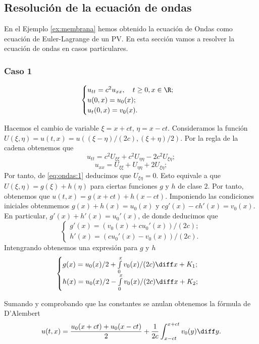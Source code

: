\documentclass{article}
\begin{document}
\subsection{Resolución de la ecuación de ondas}

En el Ejemplo \ref{ex:membrana} hemos obtenido la ecuación de Ondas como ecuación de Euler-Lagrange de un PV. En esta sección vamos a resolver la ecuación de ondas en casos particulares.

\subsubsection{Caso 1}

\begin{equation}
\label{eq:ondas:1}
  \begin{cases}
    u_{tt} = c^2 u_{xx}, \quad t \ge 0, x \in \R; \\
    u(0,x) = u_0(x); \\
    u_t(0,x) = v_0(x).
  \end{cases}
\end{equation}

Hacemos el cambio de variable $\xi = x + ct$, $\eta = x -ct$. Consideramos la función $U(\xi, \eta) = u(t,x) = u( (\xi-\eta)/(2c), (\xi+\eta)/2)$. Por la regla de la cadena obtenemos que
\[ u_{tt} = c^{2} U_{\xi \xi} + c^2 U_{\eta \eta} - 2c^2 U_{\xi \eta}; \]
\[ u_{xx} = U_{\xi \xi} +  U_{\eta \eta} +2 U_{\xi \eta}; \]
Por tanto, de \eqref{eq:ondas:1} deducimos que $U_{\xi \eta} = 0$. Esto equivale a que $U(\xi, \eta) = g(\xi) + h(\eta)$ para ciertas funciones $g$ y $h$ de clase $2$. Por tanto, obtenemos que $u(t,x) = g(x+ct) + h(x-ct)$. Imponiendo las condiciones iniciales obtenmemos $g(x)+h(x) = u_0(x)$ y $cg'(x)-ch'(x) = v_0(x)$. En particular, $g'(x) + h'(x) = u_0'(x)$, de donde deducimos que
\[
  \begin{cases}
    g'(x) = (v_0(x) + c u_0'(x)) / (2c); \\
    h'(x) = (c u_0'(x) - v_0(x)) / (2c).    
  \end{cases}
\]
Intengrando obtenemos una expresión para $g$ y $h$
\[
  \begin{cases}
    g(x) = u_0(x) / 2 + \int\limits_{0}^{x} v_0(x) / (2c) \diff x + K_1; \\
    h(x) = u_0(x) / 2 - \int\limits_{0}^{x} v_0(x) / (2c) \diff x + K_2;
  \end{cases}
\]

Sumando y comprobando que las constantes se anulan obtenemos la fórmula de D'Alembert
\begin{equation}
\label{eq:onda:dalembert}
u(t,x) = \frac{u_0(x+ct) + u_0(x-ct)}{2} + \frac{1}{2c} \int_{x-ct}^{x+ct} v_0(y) \diff y.
\end{equation}
\end{document}
